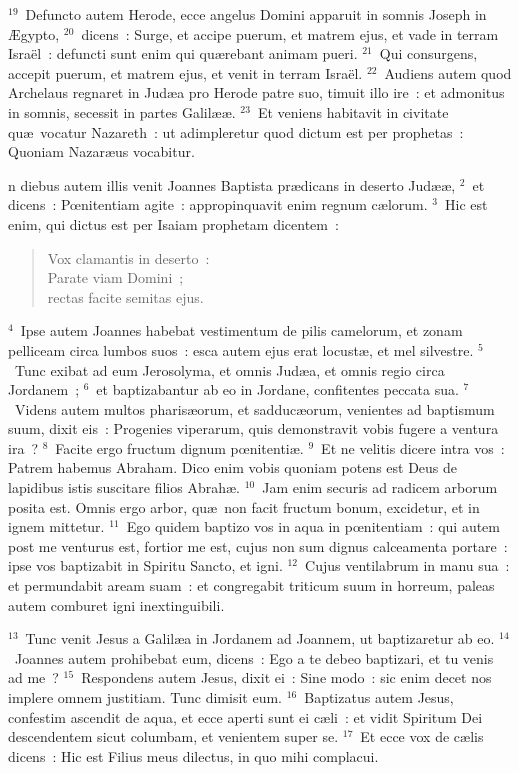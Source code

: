 ${}^{19}$~Defuncto autem Herode, ecce angelus Domini apparuit in somnis Joseph in \AE gypto,
${}^{20}$~dicens~: Surge, et accipe puerum, et matrem ejus, et vade in terram Isra\"el~: defuncti sunt enim qui qu\ae rebant animam pueri.
${}^{21}$~Qui consurgens, accepit puerum, et matrem ejus, et venit in terram Isra\"el.
${}^{22}$~Audiens autem quod Archelaus regnaret in Jud\ae a pro Herode patre suo, timuit illo ire~: et admonitus in somnis, secessit in partes Galil\ae \ae .
${}^{23}$~Et veniens habitavit in civitate qu\ae\ vocatur Nazareth~: ut adimpleretur quod dictum est per prophetas~: Quoniam Nazar\ae us vocabitur.

\bchapter
{}n diebus autem illis venit Joannes Baptista pr\ae dicans in deserto Jud\ae \ae ,
${}^{2}$~et dicens~: Pœnitentiam agite~: appropinquavit enim regnum c\ae lorum.
${}^{3}$~Hic est enim, qui dictus est per Isaiam prophetam dicentem~: \begin{verse}Vox clamantis in deserto~:\\ Parate viam Domini~;\\ rectas facite semitas ejus.\end{verse}


${}^{4}$~Ipse autem Joannes habebat vestimentum de pilis camelorum, et zonam pelliceam circa lumbos suos~: esca autem ejus erat locust\ae , et mel silvestre.
${}^{5}$~Tunc exibat ad eum Jerosolyma, et omnis Jud\ae a, et omnis regio circa Jordanem~;
${}^{6}$~et baptizabantur ab eo in Jordane, confitentes peccata sua.
${}^{7}$~Videns autem multos pharis\ae orum, et sadduc\ae orum, venientes ad baptismum suum, dixit eis~: Progenies viperarum, quis demonstravit vobis fugere a ventura ira~?
${}^{8}$~Facite ergo fructum dignum pœnitenti\ae .
${}^{9}$~Et ne velitis dicere intra vos~: Patrem habemus Abraham. Dico enim vobis quoniam potens est Deus de lapidibus istis suscitare filios Abrah\ae .
${}^{10}$~Jam enim securis ad radicem arborum posita est. Omnis ergo arbor, qu\ae\ non facit fructum bonum, excidetur, et in ignem mittetur.
${}^{11}$~Ego quidem baptizo vos in aqua in pœnitentiam~: qui autem post me venturus est, fortior me est, cujus non sum dignus calceamenta portare~: ipse vos baptizabit in Spiritu Sancto, et igni.
${}^{12}$~Cujus ventilabrum in manu sua~: et permundabit aream suam~: et congregabit triticum suum in horreum, paleas autem comburet igni inextinguibili.


${}^{13}$~Tunc venit Jesus a Galil\ae a in Jordanem ad Joannem, ut baptizaretur ab eo.
${}^{14}$~Joannes autem prohibebat eum, dicens~: Ego a te debeo baptizari, et tu venis ad me~?
${}^{15}$~Respondens autem Jesus, dixit ei~: Sine modo~: sic enim decet nos implere omnem justitiam. Tunc dimisit eum.
${}^{16}$~Baptizatus autem Jesus, confestim ascendit de aqua, et ecce aperti sunt ei c\ae li~: et vidit Spiritum Dei descendentem sicut columbam, et venientem super se.
${}^{17}$~Et ecce vox de c\ae lis dicens~: Hic est Filius meus dilectus, in quo mihi complacui.

